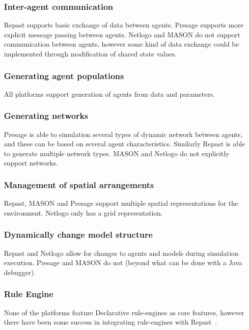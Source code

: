 \subsubsection*{Inter-agent communication}

Repast supports basic exchange of data between agents. Presage supports more explicit message passing between agents. Netlogo and MASON do not support communication between agents, however some kind of data exchange could be implemented through modification of shared state values.

\subsubsection*{Generating agent populations}

All platforms support generation of agents from data and parameters. 

\subsubsection*{Generating networks}

Presage is able to simulation several types of dynamic network between agents, and these can be based on several agent characteristics. Similarly Repast is able to generate multiple network types. MASON and Netlogo do not explicitly support networks.

\subsubsection*{Management of spatial arrangements}

Repast, MASON and Presage support multiple spatial representations for the environment. Netlogo only has a grid representation.

\subsubsection*{Dynamically change model structure}

Repast and Netlogo allow for changes to agents and models during simulation execution. Presage and MASON do not (beyond what can be done with a Java debugger).

\subsubsection*{Rule Engine}

None of the platforms feature Declarative rule-engines as core features, however there have been some success in integrating rule-engines with Repast~\citep{Lotzmann2011}. 

